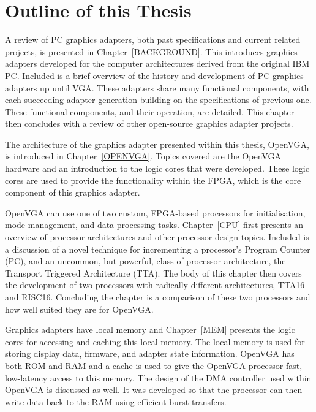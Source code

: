 \section{Outline of this Thesis}
A review of PC graphics adapters, both past specifications and current related
projects, is presented in Chapter~\ref{BACKGROUND}. This introduces graphics
adapters developed for the computer architectures derived from the original IBM
PC. Included is a brief overview of the history and development of PC graphics
adapters up until VGA. These adapters share many functional components, with each
succeeding adapter generation building on the specifications of previous one.
These functional components, and their operation, are detailed. This chapter then
concludes with a review of other open-source graphics adapter projects.

The architecture of the graphics adapter presented within this thesis, OpenVGA,
is introduced in Chapter~\ref{OPENVGA}. Topics covered are the OpenVGA hardware
and an introduction to the logic cores that were developed. These logic cores are
used to provide the functionality within the FPGA, which is the core component of
this graphics adapter.

OpenVGA can use one of two custom, FPGA-based processors for initialisation, mode
management, and data processing tasks. Chapter~\ref{CPU} first presents an
overview of processor architectures and other processor design topics. Included
is a discussion of a novel technique for incrementing a processor's Program
Counter (PC), and an uncommon,
but powerful, class of processor architecture, the Transport Triggered
Architecture
(TTA). The body of this chapter then covers the development of two processors
with radically different architectures, TTA16 and RISC16. Concluding the chapter
is a comparison of these two processors and how well suited they are for OpenVGA.

Graphics adapters have local memory and Chapter~\ref{MEM} presents the logic
cores for accessing and caching this local memory. The local memory is used for
storing display data, firmware, and adapter state information. OpenVGA has both
ROM and RAM and a cache is used to give the OpenVGA processor fast, low-latency
access to this memory. The design of the DMA controller used within OpenVGA is
discussed as well. It was developed so that the processor can then write data
back to the RAM using efficient burst transfers.

